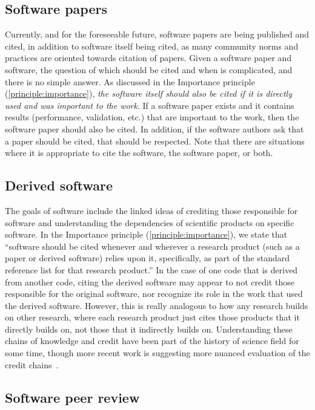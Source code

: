 \documentclass[11pt, oneside]{amsart}
\begin{document}
\subsection{Software papers} \label{sec:software_papers}

Currently, and for the foreseeable future, software papers are being published and cited,
in addition to software itself being cited, as many community norms and practices are
oriented towards citation of papers.
Given a software paper and software, the question of which should be cited and when is
complicated, and there is no simple answer.
As discussed in the Importance principle (\ref{principle:importance}), \textit{the software
itself should also be cited if it is directly used and was important to the work}.
If a software paper exists and it contains results (performance, validation, etc.) that are
important to the work, then the software paper should also be cited.
In addition, if the software authors ask that a paper should be cited, that should be respected.
Note that there are situations where it is appropriate to cite the software, the software paper, or both.

\subsection{Derived software}

The goals of software include the linked ideas of crediting those responsible for software and understanding the dependencies of scientific products on specific software.
In the Importance principle (\ref{principle:importance}), we state that
``software should be cited whenever and wherever a research product (such as a paper or derived software) relies upon it, specifically, as part of the standard reference list for that research product.''
In the case of one code that is derived from another code, citing the derived software may appear to not credit those responsible for the original software, nor recognize its role in the work that used the derived software.
However, this is really analogous to how any research builds on other research, where each research product just cites those products that it directly builds on, not those that it indirectly builds on.
Understanding these chains of knowledge and credit have been part of the history of science field for some time, though more recent work is suggesting more nuanced evaluation of the credit chains~\cite{casrai-credit, transitive_credit_json-ld}.

\subsection{Software peer review}
\end{document}
